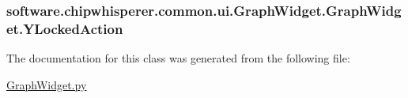 \subsubsection[{Y\+Locked\+Action}]{\setlength{\rightskip}{0pt plus 5cm}software.\+chipwhisperer.\+common.\+ui.\+Graph\+Widget.\+Graph\+Widget.\+Y\+Locked\+Action}\label{classsoftware_1_1chipwhisperer_1_1common_1_1ui_1_1GraphWidget_1_1GraphWidget_a5f04c17014e7c51c42e198e36b78b235}


The documentation for this class was generated from the following file\+:\begin{DoxyCompactItemize}
\item 
\hyperlink{GraphWidget_8py}{Graph\+Widget.\+py}\end{DoxyCompactItemize}
